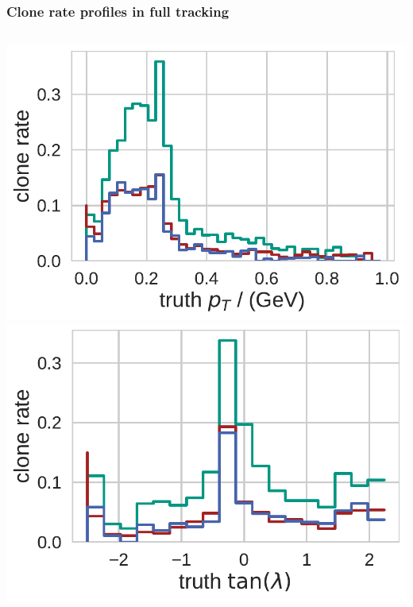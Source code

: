\documentclass[18pt, aspectratio=169]{beamer}
\begin{document}
\begin{frame}
  \frametitle{Clone rate profiles in full tracking}
  \begin{columns}
    \begin{column}{.5\textwidth}
      \centering    
      \includegraphics[width=.55\textwidth]{figures/clone_rate_by_pt_truth_fullreco_trainedWithFakes.pdf}\\
      \includegraphics[width=.55\textwidth]{figures/clone_rate_by_tan_lambda_truth_fullreco_trainedWithFakes.pdf}
    \end{column}


\end{columns}
\end{frame}
\end{document}
